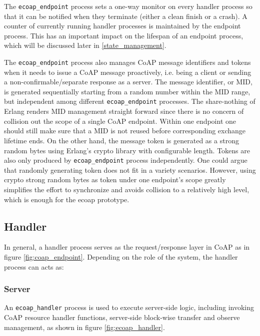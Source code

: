 The \verb|ecoap_endpoint| process sets a one-way monitor on every handler process so that it can be notified when they terminate (either a clean finish or a crash). A counter of currently running handler processes is maintained by the endpoint process. This has an important impact on the lifespan of an endpoint process, which will be discussed later in \ref{state_management}. 

The \verb|ecoap_endpoint| process also manages CoAP message identifiers and tokens when it needs to issue a CoAP message proactively, i.e. being a client or sending a non-confirmable/separate response as a server. The message identifier, or MID, is generated sequentially starting from a random number within the MID range, but independent among different \verb|ecoap_endpoint| processes. The share-nothing of Erlang renders MID management straight forward since there is no concern of collision out the scope of a single CoAP endpoint. Within one endpoint one should still make sure that a MID is not reused before corresponding exchange lifetime ends. On the other hand, the message token is generated as a strong random bytes using Erlang's crypto library with configurable length. Tokens are also only produced by  \verb|ecoap_endpoint| process independently. One could argue that randomly generating token does not fit in a variety scenarios. However, using crypto strong random bytes as token under one endpoint's scope greatly simplifies the effort to synchronize and avoids collision to a relatively high level, which is enough for the ecoap prototype.

\subsection{Handler}\label{coap_handler}

In general, a handler process serves as the request/response layer in CoAP as in figure \ref{fig:coap_endpoint}. Depending on the role of the system, the handler process can acts as:

\subsubsection{Server}

An \verb|ecoap_handler| process is used to execute server-side logic, including invoking CoAP resource handler functions, server-side block-wise transfer and observe management, as shown in figure \ref{fig:ecoap_handler}. 

